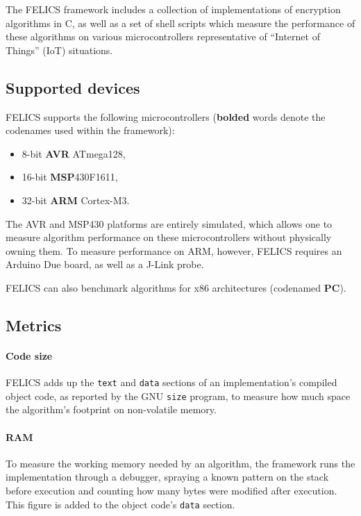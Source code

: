 \documentclass{article}
\begin{document}
The FELICS framework\cite{FELICS:paper} includes a collection of
implementations of encryption algorithms in C, as well as a set of
shell scripts which measure the performance of these algorithms on
various microcontrollers representative of ``Internet of Things''
(IoT) situations.

\subsection{Supported devices}
\label{sec:felics/devices}

FELICS supports the following microcontrollers (\textbf{bolded} words
denote the codenames used within the framework):

\begin{itemize}
\item 8-bit \textbf{AVR} ATmega128,
\item 16-bit \textbf{MSP}430F1611,
\item 32-bit \textbf{ARM} Cortex-M3.
\end{itemize}

The AVR and MSP430 platforms are entirely simulated, which allows one
to measure algorithm performance on these microcontrollers without
physically owning them.  To measure performance on ARM, however,
FELICS requires an Arduino Due board, as well as a J-Link probe.

FELICS can also benchmark algorithms for x86 architectures (codenamed
\textbf{PC}).

\subsection{Metrics}
\label{sec:felics/metrics}

\paragraph{Code size}

FELICS adds up the \texttt{text} and \texttt{data} sections of an
implementation's compiled object code, as reported by the GNU
\texttt{size} program, to measure how much space the algorithm's
footprint on non-volatile memory.

\paragraph{RAM}

To measure the working memory needed by an algorithm, the framework
runs the implementation through a debugger, spraying a known pattern
on the stack before execution and counting how many bytes were
modified after execution.  This figure is added to the object code's
\texttt{data} section.
\end{document}
